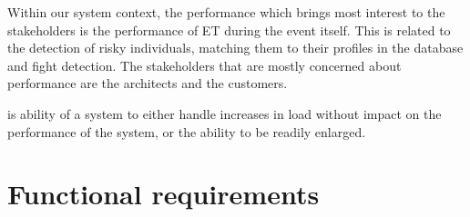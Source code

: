 \begin{description}[align=left]
  Within our system context, the performance which brings most interest to the stakeholders is the performance of \ac{ET} during the event itself. This is related to the detection of risky individuals, matching them to their profiles in the database and fight detection.
  The stakeholders that are mostly concerned about performance are the architects and the customers.

\item[Scalability] is ability \cite{web:df} of a system to either handle increases in load without impact on the performance of the system, or the ability to be readily enlarged. 

\end{description}




\section{Functional requirements}


